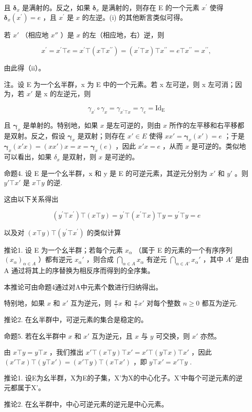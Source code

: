 且 \(\pmb{\delta}_{x}\) 是满射的。反之，如果 \(\pmb{\delta}_{x}\) 是满射的，则存在 E 的一个元素 \(x^{\prime}\) 使得 \(\pmb{\delta}_{x}(x^{\prime}) = e\) ，且 \(x^{\prime}\) 是 \(x\) 的左逆。(i) 的其他断言类似可得。

若 \(x'\) （相应地 \(x''\) ）是 \(x\) 的左（相应地，右）逆，则

\[
x ^ {\prime} = x ^ {\prime} \top e = x ^ {\prime} \top (x \top x ^ {\prime \prime}) = (x ^ {\prime} \top x) \top x ^ {\prime \prime} = e \top x ^ {\prime \prime} = x ^ {\prime \prime},
\]

由此得（ii）。

注。设 E 为一个幺半群，x 为 E 中的一个元素。若 x 左可逆，则 x 左可消；因为，若 \(x'\) 是 x 的左逆元，则

\[
\gamma_ {x ^ {\prime}} \circ \gamma_ {x} = \gamma_ {x ^ {\prime} \top x} = \gamma_ {e} = \mathrm{Id} _ {\mathrm{E}}
\]

且 \(\pmb{\gamma}_{x}\) 是单射的。特别地，如果 \(x\) 是左可逆的，则由 \(x\) 所作的左平移和右平移都是双射。反之，假设 \(\pmb{\gamma}_{x}\) 是双射；则存在 \(x' \in E\) 使得 \(xx' = \pmb{\gamma}_{x}(x') = e\) ；于是 \(\pmb{\gamma}_{x}(x' x) = (xx') x = x = \pmb{\gamma}_{x}(e)\) ，因此 \(x' x = e\) ，从而 \(x\) 是可逆的。类似地可以看出，如果 \(\delta_{x}\) 是双射，则 \(x\) 是可逆的。

命题4. 设 E 是一个幺半群，x 和 y 是 E 的可逆元素，其逆元分别为 \(x'\) 和 \(y'\) 。则 \(y' \top x'\) 是 \(x \top y\) 的逆.

这由以下关系得出

\[
\left(y ^ {\prime} \top x ^ {\prime}\right) \top (x \top y) = y ^ {\prime} \top \left(x ^ {\prime} \top x\right) \top y = y ^ {\prime} \top y = e
\]

以及对 \((x\top y)\top (y^{\prime}\top x^{\prime})\) 的类似计算

推论1. 设 E 为一个幺半群；若每个元素 \(x_{\alpha}\) （属于 E 的元素的一个有序序列 \((x_{\alpha})_{\alpha \in A}\) ）都有逆元 \(x_{\alpha}'\) ，则合成 \(\bigcap_{\alpha \in A} x_{\alpha}\) 有逆元 \(\bigcap_{\alpha \in A'} x_{\alpha}'\) ，其中 \(A'\) 是由 A 通过将其上的序替换为相反序而得到的全序集。

本推论可由命题4通过对A中元素个数进行归纳得出。

特别地，如果 \(x\) 和 \(x'\) 互为逆元，则 \(\frac{\pi}{\top} x\) 和 \(\frac{\pi}{\top} x'\) 对每个整数 \(n \geqslant 0\) 都互为逆元.

推论2. 在幺半群中，可逆元素的集合是稳定的。

命题5. 若在幺半群中 \(x\) 和 \(x'\) 互为逆元，且 \(x\) 与 \(y\) 可交换，则 \(x'\) 亦然。

由 \(x \top y = y \top x\) ，我们推出 \(x' \top (x \top y) \top x' = x' \top (y \top x) \top x'\) ，因此 \((x' \top x) \top (y \top x') = (x' \top y) \top (x \top x')\) ，即 \(y \top x' = x' \top y\) .

推论1. 设E为幺半群，X为E的子集，X'为X的中心化子。X'中每个可逆元素的逆元都属于X'。

推论2. 在幺半群中，中心可逆元素的逆元是中心元素。

